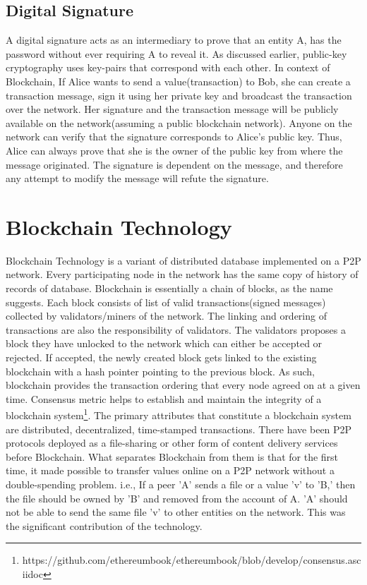 \subsection{Digital Signature} \label{ss:digitalsignature}
A digital signature acts as an intermediary to prove that an entity A, has the
password without ever requiring A to reveal it. As discussed earlier,
public-key cryptography uses key-pairs that correspond with each other. In
context of Blockchain, If Alice wants to send a value(transaction) to Bob, she
can create a transaction message, sign it using her private key and broadcast
the transaction over the network. Her signature and the transaction message
will be publicly available on the network(assuming a public blockchain
network). Anyone on the network can verify that the signature corresponds to
Alice's public key. Thus, Alice can always prove that she is the owner of the
public key from where the message originated. The signature is dependent on the
message, and therefore any attempt to modify the message will refute the
signature.


\section{Blockchain Technology} \label{sec:blockchain}
Blockchain Technology is a variant of distributed database implemented on a P2P
network. Every participating node in the network has the same copy of history
of records of database. Blockchain is essentially a chain of blocks, as the
name suggests. Each block consists of list of valid transactions(signed
messages) collected by validators/miners of the network. The linking and
ordering of transactions are also the responsibility of validators. The
validators proposes a block they have unlocked to the network which can either
be accepted or rejected. If accepted, the newly created block gets linked to
the existing blockchain with a hash pointer pointing to the previous block. As
such, blockchain provides the transaction ordering that every node agreed on at
a given time. Consensus metric helps to establish and maintain the integrity of
a blockchain
system\footnote{https://github.com/ethereumbook/ethereumbook/blob/develop/consensus.asciidoc}.
The primary attributes that constitute a blockchain system are distributed,
decentralized, time-stamped transactions.  
There have been P2P protocols deployed as a file-sharing or other form of
content delivery services before Blockchain. What separates Blockchain from
them is that for the first time, it made possible to transfer values online on
a P2P network without a double-spending problem. i.e., If a peer 'A' sends a
file or a value 'v' to 'B,' then the file should be owned by 'B' and removed
from the account of A. 'A' should not be able to send the same file 'v' to
other entities on the network. This was the significant contribution of the
technology. 

